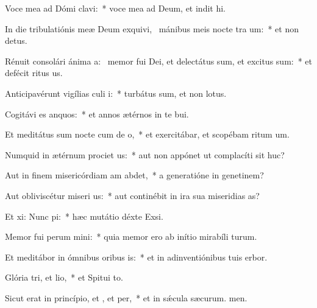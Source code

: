 \item Voce mea ad Dómi clavi:~* voce mea ad Deum, et indit hi.
\item In die tribulatiónis meæ Deum exquivi,~\pscross{} mánibus meis nocte tra um:~* et non  detus.
\item Rénuit consolári ánima a:~\pscross{} memor fui Dei, et delectátus sum, et excitus sum:~* et defécit ritus us.
\item Anticipavérunt vigílias culi i:~* turbátus sum, et non  lotus.
\item Cogitávi es anquos:~* et annos ætérnos in te bui.
\item Et meditátus sum nocte cum de o,~* et exercitábar, et scopébam ritum um.
\item Numquid in ætérnum prociet us:~* aut non appónet ut complacíti sit huc?
\item Aut in finem misericórdiam am abdet,~* a generatióne in genetinem?
\item Aut obliviscétur miseri us:~* aut continébit in ira sua miseridias as?
\item Et xi: Nunc pi:~* hæc mutátio déxte Exsi.
\item Memor fui perum mini:~* quia memor ero ab inítio mirabíli turum.
\item Et meditábor in ómnibus oribus is:~* et in adinventiónibus tuis erbor.
\item Glória tri, et lio,~* et Spitui to.
\item Sicut erat in princípio, et , et per,~* et in sǽcula sæcurum. men.
